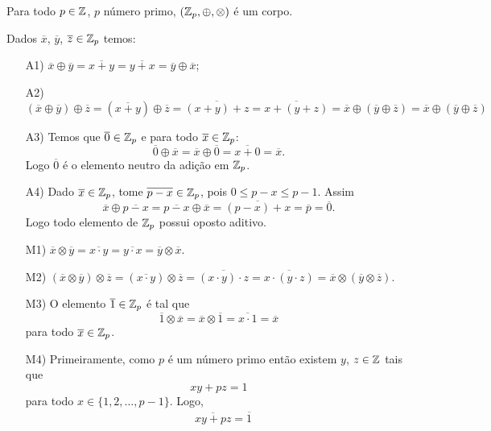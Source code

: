 \begin{teorema}
Para todo $p \in \mathbb{Z}$, $p$ n\'umero primo, $(\mathbb{Z}_p, \oplus, \otimes)$ \'e um corpo.
\end{teorema}
\begin{prova}
Dados $\overline{x}$, $\overline{y}$, $\overline{z} \in \mathbb{Z}_p$ temos:
\begin{enumerate}
	\item[A1)] $\overline{x} \oplus \overline{y} = \overline{x + y} = \overline{y + x} = \overline{y} \oplus \overline{x}$;
	\item[A2)] $(\overline{x} \oplus \overline{y}) \oplus \overline{z} = (\overline{x + y}) \oplus \overline{z} = \overline{(x + y) + z} = \overline{x + (y + z)} = \overline{x} \oplus (\overline{y} \oplus \overline{z}) = \overline{x} \oplus (\overline{y} \oplus \overline{z})$
	\item[A3)] Temos que $\overline{0} \in \mathbb{Z}_p$ e para todo $\overline{x} \in \mathbb{Z}_p$:
	\[
	\overline{0} \oplus \overline{x} = \overline{x} \oplus \overline{0} = \overline{x + 0} = \overline{x}.
	\]
	Logo $\overline{0}$ \'e o elemento neutro da adi\c{c}\~ao em $\mathbb{Z}_p$.
	\item[A4)] Dado $\overline{x} \in \mathbb{Z}_p$, tome $\overline{p - x} \in \mathbb{Z}_p$, pois $0 \le p - x \le p - 1$. Assim
	\[
	\overline{x} \oplus \overline{p - x} = \overline{p - x} \oplus \overline{x} = \overline{(p - x) + x} = \overline{p} = \overline{0}.
	\]
	Logo todo elemento de $\mathbb{Z}_p$ possui oposto aditivo.
	\item[M1)] $\overline{x} \otimes \overline{y} = \overline{x\cdot y} = \overline{y \cdot x} = \overline{y} \otimes \overline{x}$.
	\item[M2)] $(\overline{x} \otimes \overline{y}) \otimes \overline{z} = (\overline{x\cdot y}) \otimes \overline{z} = \overline{(x\cdot y) \cdot z} = 
	\overline{x\cdot (y\cdot z)} = \overline{x} \otimes (\overline{y} \otimes \overline{z})$.
	\item[M3)] O elemento $\overline{1} \in \mathbb{Z}_p$ \'e tal que
	\[
	\overline{1} \otimes \overline{x} = \overline{x} \otimes \overline{1} = \overline{x\cdot 1} = \overline{x}
	\]
	para todo $\overline{x} \in \mathbb{Z}_p$.
	\item[M4)] Primeiramente, como $p$ \'e um n\'umero primo ent\~ao existem $y$, $z \in \mathbb{Z}$ tais que
	\[
	xy + pz = 1
	\]
	para todo $x \in \{1, 2, \dots, p - 1\}$. Logo,
	\begin{align*}
	&\overline{xy + pz} = \overline{1}\\

\end{align*}
\end{enumerate}
\end{prova}

